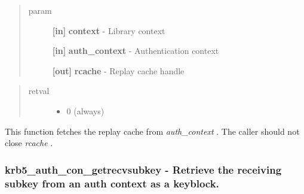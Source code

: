 \documentclass[letterpaper,10pt,english]{sphinxmanual}
\begin{document}
\begin{fulllineitems}
\label{appdev/refs/api/krb5_auth_con_getrcache:krb5_auth_con_getrcache}
\end{fulllineitems}

\begin{quote}\begin{description}
\item[{param}] \leavevmode
\textbf{{[}in{]}} \textbf{context} - Library context

\textbf{{[}in{]}} \textbf{auth\_context} - Authentication context

\textbf{{[}out{]}} \textbf{rcache} - Replay cache handle

\end{description}\end{quote}
\begin{quote}\begin{description}
\item[{retval}] \leavevmode\begin{itemize}
\item {} 
0   (always)

\end{itemize}

\end{description}\end{quote}

This function fetches the replay cache from \emph{auth\_context} . The caller should not close \emph{rcache} .


\subsubsection{krb5\_auth\_con\_getrecvsubkey -  Retrieve the receiving subkey from an auth context as a keyblock.}
\label{appdev/refs/api/krb5_auth_con_getrecvsubkey:krb5-auth-con-getrecvsubkey-retrieve-the-receiving-subkey-from-an-auth-context-as-a-keyblock}\label{appdev/refs/api/krb5_auth_con_getrecvsubkey::doc}

\begin{fulllineitems}
\label{appdev/refs/api/krb5_auth_con_getrecvsubkey:krb5_auth_con_getrecvsubkey}
\end{fulllineitems}
\end{document}
